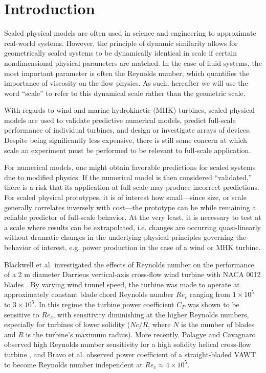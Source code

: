 \documentclass[energies,article,accept,moreauthors,pdftex,12pt,a4paper]{mdpi}
\begin{document}
\listoftodos

\section{Introduction}

Scaled physical models are often used in science and engineering to approximate
real-world systems. However, the principle of dynamic similarity allows for
geometrically scaled systems to be dynamically identical in scale if certain
nondimensional physical parameters are matched. In the case of fluid systems,
the most important parameter is often the Reynolds number, which quantifies the
importance of viscosity on the flow physics. As such, hereafter we will use the
word ``scale'' to refer to this dynamical scale rather than the geometric scale.

With regards to wind and marine hydrokinetic (MHK) turbines, scaled physical
models are used to validate predictive numerical models, predict full-scale
performance of individual turbines, and design or investigate arrays of devices.
Despite being significantly less expensive, there is still some concern at which
scale an experiment must be performed to be relevant to full-scale application.

For numerical models, one might obtain favorable predictions for scaled systems
due to modified physics. If the numerical model is then considered
``validated,'' there is a risk that its application at full-scale may produce
incorrect predictions. For scaled physical prototypes, it is of interest how
small---since size, or scale generally correlates inversely with cost---the
prototype can be while remaining a reliable predictor of full-scale behavior. At
the very least, it is necessary to test at a scale where results can be
extrapolated, i.e. changes are occurring quasi-linearly without dramatic changes
in the underlying physical principles governing the behavior of interest, e.g.
power production in the case of a wind or MHK turbine.

Blackwell et al. investigated the effects of Reynolds number on the performance
of a 2 m diameter Darrieus vertical-axis cross-flow wind turbine with NACA 0012
blades \cite{Blackwell1976}. By varying wind tunnel speed, the turbine was made
to operate at approximately constant blade chord Reynolds number $Re_c$ ranging
from $1 \times 10^5$ to $3 \times 10^5$. In this regime the turbine power
coefficient $C_P$ was shown to be sensitive to $Re_c$, with sensitivity
diminishing at the higher Reynolds numbers, especially for turbines of lower
solidity ($Nc/R$, where $N$ is the number of blades and $R$ is the turbine's
maximum radius). More recently, Polagye and Cavagnaro observed high Reynolds
number sensitivity for a high solidity helical cross-flow turbine
\cite{Polagye2013b}, and Bravo et al. observed power coefficient of a
straight-bladed VAWT to become Reynolds number independent at $Re_c \approx 4
\times 10^5$.
\end{document}
